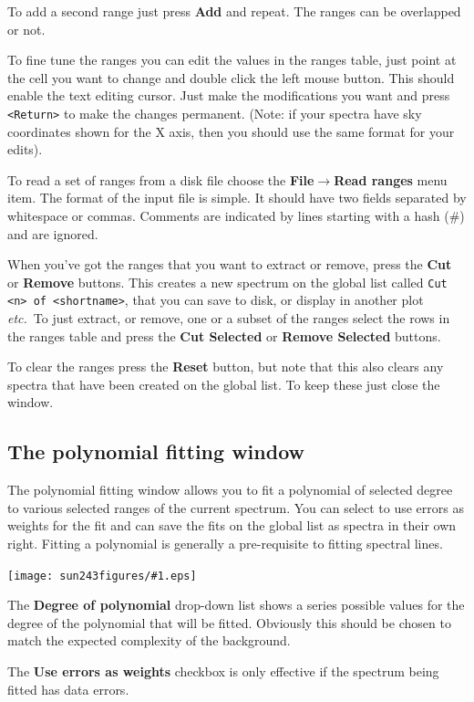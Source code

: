 \documentclass[twoside,11pt]{article}
\newcommand{\htmladdimg}[1]{}
\newcommand{\latexhtml}[2]{#1}
\renewcommand{\_}{\texttt{\symbol{95}}}
\newcommand{\mainfigure}[1]
{\begin{center}
 \latexhtml{\texttt{[image: sun243\_figures/\#1.eps]}}{\htmladdimg{#1.gif}}
 \end{center}
}
\newcommand{\submenuitem}[2]{\latexhtml{\textbf{#1$\rightarrow$#2}}{\textbf{#1->#2}}}
\newcommand{\labelitem}[1]{\textbf{#1}}
\newcommand{\hitext}[1]{\texttt{#1}}
\newcommand{\etc}{\textit{etc.}}
\begin{document}
To add a second range just press \labelitem{Add} and repeat. The
ranges can be overlapped or not.

To fine tune the ranges you can edit the values in the ranges table,
just point at the cell you want to change and double click the left
mouse button. This should enable the text editing cursor. Just make
the modifications you want and press \hitext{<Return>} to make the
changes permanent. (Note: if your spectra have sky coordinates shown
for the X axis, then you should use the same format for your edits).

To read a set of ranges from a disk file choose the
\submenuitem{File}{Read ranges} menu item. The format of the input file
is simple. It should have two fields separated by whitespace or
commas. Comments are indicated by lines starting with a hash (\#)
and are ignored.

When you've got the ranges that you want to extract or remove, press the
\labelitem{Cut} or \labelitem{Remove} buttons. This creates a new
spectrum on the global list called \hitext{Cut <n> of <shortname>},
that you can save to disk, or display in another plot \etc\ To just
extract, or remove, one or a subset of the ranges select the rows in
the ranges table and press the \labelitem{Cut Selected} or
\labelitem{Remove Selected} buttons.

To clear the ranges press the \labelitem{Reset} button, but note that
this also clears any spectra that have been created on the global
list. To keep these just close the window.

\newpage
\subsection{The polynomial fitting window}

The polynomial fitting window allows you to fit a polynomial of selected
degree to various selected ranges of the current spectrum. You can select to
use errors as weights for the fit and can save the fits on the global list as
spectra in their own right. Fitting a polynomial is generally a pre-requisite
to fitting spectral lines.

\mainfigure{polynomialfitwindow}

The \labelitem{Degree of polynomial} drop-down list shows a series
possible values for the degree of the polynomial that will be
fitted. Obviously this should be chosen to match the expected
complexity of the background.

The \labelitem{Use errors as weights} checkbox is only effective if
the spectrum being fitted has data errors.
\end{document}
